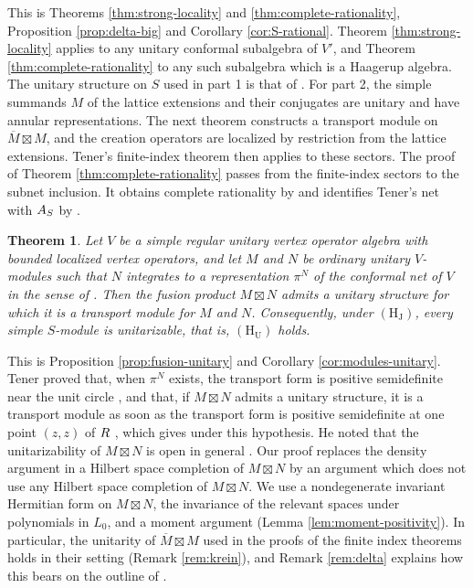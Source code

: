 \documentclass[leqno]{article}
\let\cal\relax
\newcommand{\cal}{\mathcal}
\newcommand{\ovl}{\overline}
\newtheorem{thm}{Theorem}[section]
\numberwithin{equation}{section}
\begin{document}
This is Theorems \ref{thm:strong-locality} and \ref{thm:complete-rationality}, Proposition \ref{prop:delta-big} and Corollary \ref{cor:S-rational}. Theorem \ref{thm:strong-locality} applies to any unitary conformal subalgebra of $V'$, and Theorem \ref{thm:complete-rationality} to any such subalgebra which is a Haagerup algebra. The unitary structure on $S$ used in part 1 is that of \cite[Theorem 10.10]{Arh26}. For part 2, the simple summands $M$ of the lattice extensions and their conjugates are unitary and have annular representations. The next theorem constructs a transport module on $\ovl M \boxtimes M$, and the creation operators are localized by restriction from the lattice extensions. Tener's finite-index theorem \cite[Theorem 4.19]{Ten24} then applies to these sectors. The proof of Theorem \ref{thm:complete-rationality} passes from the finite-index sectors to the subnet inclusion. It obtains complete rationality by \cite[Theorem 24 p.~20]{Lon03} and identifies Tener's net with $\cal A_S$ by \cite[Lemma 7.6 p.~72]{Ten19a}.

\begin{thm}
\label{thm:intro-U}
Let $V$ be a simple regular unitary vertex operator algebra with bounded localized vertex operators, and let $M$ and $N$ be ordinary unitary $V$-modules such that $N$ integrates to a representation $\pi^N$ of the conformal net of $V$ in the sense of \cite[Definition 2.18 p.~20]{Ten24}. Then the fusion product $M \boxtimes N$ admits a unitary structure for which it is a transport module for $M$ and $N$. Consequently, under $\mathrm{(H_J)}$, every simple $S$-module is unitarizable, that is, $\mathrm{(H_U)}$ holds.
\end{thm}

This is Proposition \ref{prop:fusion-unitary} and Corollary \ref{cor:modules-unitary}. Tener proved that, when $\pi^N$ exists, the transport form is positive semidefinite near the unit circle \cite[Proposition 4.2 p.~43]{Ten24}, and that, if $M \boxtimes N$ admits a unitary structure, it is a transport module as soon as the transport form is positive semidefinite at one point $(z,z)$ of $\cal R$ \cite[Proposition 3.16 p.~36]{Ten24}, which gives \cite[Theorem 4.4 and Corollary 4.5 p.~44]{Ten24} under this hypothesis. He noted that the unitarizability of $M \boxtimes N$ is open in general \cite[Remark 3.18 p.~37]{Ten24}. Our proof replaces the density argument in a Hilbert space completion of $M \boxtimes N$ by an argument which does not use any Hilbert space completion of $M \boxtimes N$. We use a nondegenerate invariant Hermitian form on $M \boxtimes N$, the invariance of the relevant spaces under polynomials in $L_0$, and a moment argument (Lemma \ref{lem:moment-positivity}). In particular, the unitarity of $\ovl{M} \boxtimes M$ used in the proofs of the finite index theorems \cite[Theorem 4.20 p.~55 and Corollaries 4.21 and 4.24 pp.~55--56]{Ten24} holds in their setting (Remark \ref{rem:krein}), and Remark \ref{rem:delta} explains how this bears on the outline of \cite[Section 6 p.~8]{Hua26}.
\end{document}

